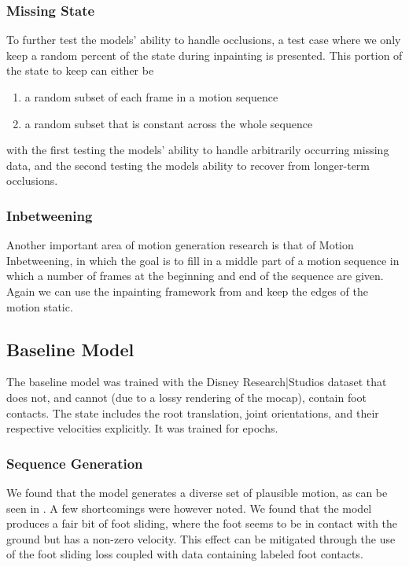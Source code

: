 \subsubsection{Missing State}
To further test the models' ability to handle occlusions, a test case where we only keep a random percent of the state during inpainting is presented. This portion of the state to keep can either be 
\begin{enumerate}
    \item a random subset of each frame in a motion sequence
    \item a random subset that is constant across the whole sequence
\end{enumerate}
with the first testing the models' ability to handle arbitrarily occurring missing data, and the second testing the models ability to recover from longer-term occlusions.

\subsubsection{Inbetweening}
Another important area of motion generation research is that of Motion Inbetweening, in which the goal is to fill in a middle part of a motion sequence in which a number of frames at the beginning and end of the sequence are given. Again we can use the inpainting framework from  and keep the edges of the motion static.


\subsection{Baseline Model}
\label{sec:baseline_evaluation}
The baseline model was trained with the Disney Research|Studios dataset that does not, and cannot (due to a lossy rendering of the mocap), contain foot contacts. The state includes the root translation, joint orientations, and their respective velocities explicitly. It was trained for  epochs. 

\subsubsection{Sequence Generation}
We found that the model generates a diverse set of plausible motion, as can be seen in . A few shortcomings were however noted. We found that the model produces a fair bit of foot sliding, where the foot seems to be in contact with the ground but has a non-zero velocity. This effect can be mitigated through the use of the foot sliding loss coupled with data containing labeled foot contacts.

